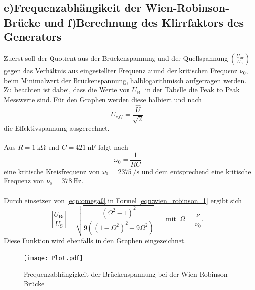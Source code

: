 \documentclass[
  bibliography=totoc,     %
  captions=tableheading,  %
  titlepage=firstiscover, %
]{scrartcl}
\begin{document}
\subsection{e)Frequenzabhängikeit der Wien-Robinson-Brücke und f)Berechnung des Klirrfaktors des Generators}
Zuerst soll der Quotient aus der Brückenspannung und der Quellspannung $\left( \frac{U_\mathup{Br}}{U_\mathup{S}} \right)$
gegen das Verhältnis aus eingestellter Frequenz $\nu$ und der kritischen Frequenz $\nu_0$, beim
Minimalwert der Brückenspannung, halblogarithmisch aufgetragen werden.
Zu beachten ist dabei, dass die Werte von $U_\mathup{Br}$ in der Tabelle die Peak to Peak Messwerte sind.
Für den Graphen werden diese halbiert und nach
\begin{equation}
  U_{eff} = \frac{\hat{U}}{\sqrt{2}}
  \label{eqn:effektivspannung}
\end{equation}
die Effektivspannung ausgerechnet.
\\
\\
Aus $R = \SI{1}{\kilo\ohm}$ und $C = \SI{421}{\nano\farad}$ folgt nach
\begin{equation}
  \omega_0 = \frac{1}{R C}
  \label{eqn:omega0}
\end{equation}
eine kritische Kreisfrequenz von $\omega_0 = \SI{2375}{\per\second}$ und dem entsprechend
eine kritische Frequenz von $\nu_0 = \SI{378}{\hertz}$.
\\
\\
Durch einsetzen von \eqref{eqn:omega0} in Formel \eqref{eqn:wien_robinson_1}
ergibt sich
\begin{equation}
  \left|\frac{U_\mathup{Br}}{U_\mathup{S}}\right| = \sqrt{\frac{\left(\Omega^2 - 1\right)^2}{9\left(\left(1 - \Omega^2 \right)^2 + 9 \Omega^2 \right)}} \;\;\;\;\;\; \text{mit} \;\; \Omega = \frac{\nu}{\nu_0}.
  \label{eqn:wien_robinson_2}
\end{equation}
Diese Funktion wird ebenfalls in den Graphen eingezeichnet.

\begin{figure}
  \centering
  \texttt{[image: Plot.pdf]}
  \caption{Frequenzabhängigkeit der Brückenspannung bei der Wien-Robinson-Brücke}
  \label{fig:plot}
\end{figure}
\end{document}
